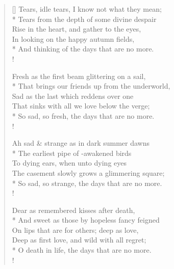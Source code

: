 \documentclass[MAIN]{subfiles}
\begin{document}
\settowidth{\versewidth}{Tears, idle tears, I know not what they mean;}
\begin{verse}[\versewidth]
Tears, idle tears, I know not what they mean;\\*
Tears from the depth of some divine despair\\
Rise in the heart, and gather to the eyes,\\
In looking on the happy autumn fields,\\*
And thinking of the days that are no more.\\!

Fresh as the first beam glittering on a sail,\\*
That brings our friends up from the underworld,\\
Sad as the last which reddens over one\\
That sinks with all we love below the verge;\\*
So sad, so fresh, the days that are no more.\\!

Ah sad \& strange as in dark summer dawns\\*
The earliest pipe of -awakened birds\\
To dying ears, when unto dying eyes\\
The casement slowly grows a glimmering square;\\*
So sad, so strange, the days that are no more.\\!

Dear as remembered kisses after death,\\*
And sweet as those by hopeless fancy feigned\\
On lips that are for others; deep as love,\\
Deep as first love, and wild with all regret;\\*
O death in life, the days that are no more.\\!
\end{verse}
\end{document}
